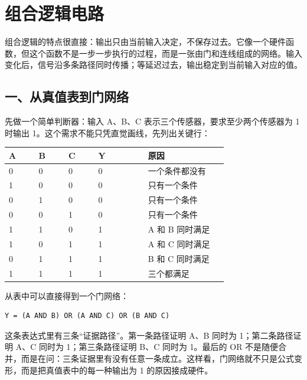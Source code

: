 \chapter{组合逻辑电路}

组合逻辑的特点很直接：输出只由当前输入决定，不保存过去。它像一个硬件函数，但这个函数不是一步一步执行的过程，而是一张由门和连线组成的网络。输入变化后，信号沿多条路径同时传播；等延迟过去，输出稳定到当前输入对应的值。

\section{一、从真值表到门网络}

先做一个简单判断器：输入 A、B、C 表示三个传感器，要求至少两个传感器为 1 时输出 1。这个需求不能只凭直觉画线，先列出关键行：

\begin{longtable}{p{0.12\linewidth}p{0.12\linewidth}p{0.12\linewidth}p{0.2\linewidth}p{0.32\linewidth}}
\toprule
A & B & C & Y & 原因 \\
\midrule
0 & 0 & 0 & 0 & 一个条件都没有 \\
1 & 0 & 0 & 0 & 只有一个条件 \\
0 & 1 & 0 & 0 & 只有一个条件 \\
0 & 0 & 1 & 0 & 只有一个条件 \\
1 & 1 & 0 & 1 & A 和 B 同时满足 \\
1 & 0 & 1 & 1 & A 和 C 同时满足 \\
0 & 1 & 1 & 1 & B 和 C 同时满足 \\
1 & 1 & 1 & 1 & 三个都满足 \\
\bottomrule
\end{longtable}

从表中可以直接得到一个门网络：

\begin{lstlisting}
Y = (A AND B) OR (A AND C) OR (B AND C)
\end{lstlisting}

这条表达式里有三条“证据路径”。第一条路径证明 A、B 同时为 1；第二条路径证明 A、C 同时为 1；第三条路径证明 B、C 同时为 1。最后的 OR 不是随便合并，而是在问：三条证据里有没有任意一条成立。这样看，门网络就不只是公式变形，而是把真值表中的每一种输出为 1 的原因接成硬件。

